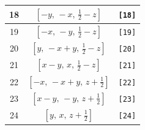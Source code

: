 \documentclass[fleqn,8pt]{jsarticle}
\begin{document}
\begin{longtable}{ccc}
18 & $\left[ - y,\, - x,\, \frac{1}{2} - z \right]$ & {\tt [18]} \\ \hline
19 & $\left[ - x,\, - y,\, \frac{1}{2} - z \right]$ & {\tt [19]} \\ \hline
20 & $\left[ y,\, - x + y,\, \frac{1}{2} - z \right]$ & {\tt [20]} \\ \hline
21 & $\left[ x - y,\, x,\, \frac{1}{2} - z \right]$ & {\tt [21]} \\ \hline
22 & $\left[ - x,\, - x + y,\, z + \frac{1}{2} \right]$ & {\tt [22]} \\ \hline
23 & $\left[ x - y,\, - y,\, z + \frac{1}{2} \right]$ & {\tt [23]} \\ \hline
24 & $\left[ y,\, x,\, z + \frac{1}{2} \right]$ & {\tt [24]} \\
\end{longtable}
\end{document}
